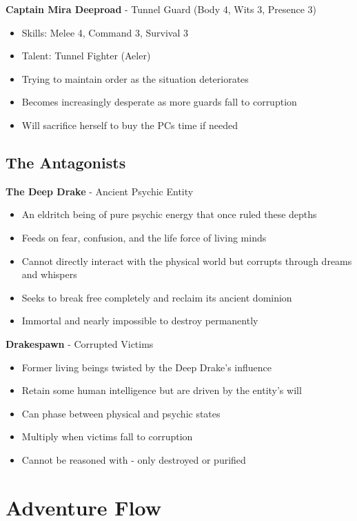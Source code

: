 \documentclass[11pt]{article}
\begin{document}
\textbf{Captain Mira Deeproad} - Tunnel Guard (Body 4, Wits 3, Presence 3)
\begin{itemize}
\item Skills: Melee 4, Command 3, Survival 3
\item Talent: Tunnel Fighter (Aeler)
\item Trying to maintain order as the situation deteriorates
\item Becomes increasingly desperate as more guards fall to corruption
\item Will sacrifice herself to buy the PCs time if needed
\end{itemize}

\subsection{The Antagonists}

\textbf{The Deep Drake} - Ancient Psychic Entity
\begin{itemize}
\item An eldritch being of pure psychic energy that once ruled these depths
\item Feeds on fear, confusion, and the life force of living minds
\item Cannot directly interact with the physical world but corrupts through dreams and whispers
\item Seeks to break free completely and reclaim its ancient dominion
\item Immortal and nearly impossible to destroy permanently
\end{itemize}

\textbf{Drakespawn} - Corrupted Victims
\begin{itemize}
\item Former living beings twisted by the Deep Drake's influence
\item Retain some human intelligence but are driven by the entity's will
\item Can phase between physical and psychic states
\item Multiply when victims fall to corruption
\item Cannot be reasoned with - only destroyed or purified
\end{itemize}

\section{Adventure Flow}
\end{document}
